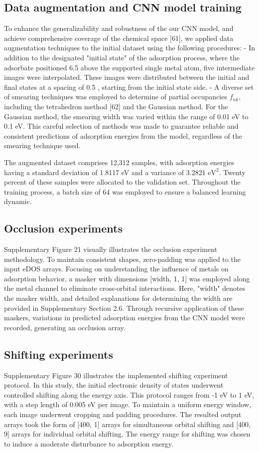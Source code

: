\subsection{Data augmentation and CNN model training}
To enhance the generalizability and robustness of the our CNN model, and achieve comprehensive coverage of the chemical space [61], we applied data augmentation techniques to the initial dataset using the following procedures:
	- In addition to the designated "initial state" of the adsorption process, where the adsorbate positioned 6.5 \text{\AA} above the supported single metal atom, five intermediate images were interpolated. These images were distributed between the initial and final states at a spacing of 0.5 \text{\AA}, starting from the initial state side.
	- A diverse set of smearing techniques was employed to determine of partial occupancies $f_{nk}$, including the tetrahedron method [62] and the Gaussian method. For the Gaussian method, the smearing width was varied within the range of 0.01 eV to 0.1 eV. This careful selection of methods was made to guarantee reliable and consistent predictions of adsorption energies from the model, regardless of the smearing technique used.

The augmented dataset comprises 12,312 samples, with adsorption energies having a standard deviation of 1.8117 eV and a variance of 3.2821 $\mathrm{eV}^2$.
Twenty percent of these samples were allocated to the validation set. Throughout the training process, a batch size of 64 was employed to ensure a balanced learning dynamic.


\subsection{Occlusion experiments}
Supplementary Figure 21 visually illustrates the occlusion experiment methodology.
To maintain consistent shapes, zero-padding was applied to the input eDOS arrays.
Focusing on understanding the influence of metals on adsorption behavior, a masker with dimensions [width, 1, 1] was employed along the metal channel to eliminate cross-orbital interactions.
Here, "width" denotes the masker width, and detailed explanations for determining the width are provided in Supplementary Section 2.6.
Through recursive application of these maskers, variations in predicted adsorption energies from the CNN model were recorded, generating an occlusion array.


\subsection{Shifting experiments}
Supplementary Figure 30 illustrates the implemented shifting experiment protocol.
In this study, the initial electronic density of states underwent controlled shifting along the energy axis.
This protocol ranges from -1 eV to 1 eV, with a step length of 0.005 eV per image.
To maintain a uniform energy window, each image underwent cropping and padding procedures.
The resulted output arrays took the form of [400, 1] arrays for simultaneous orbital shifting and [400, 9] arrays for individual orbital shifting.
The energy range for shifting was chosen to induce a moderate disturbance to adsorption energy.


